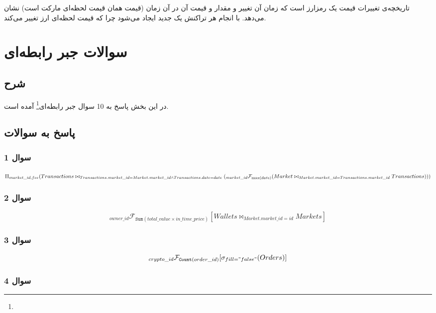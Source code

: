 \documentclass{book}
\begin{document}
\subsection{}
تاریخچه‌ی تغییرات قیمت یک رمزارز است که زمان آن تغییر و مقدار و قیمت آن در آن زمان (قیمت همان قیمت لحظه‌ای مارکت است) نشان می‌دهد. با انجام هر تراکنش یک  جدید ایجاد می‌شود چرا که قیمت لحظه‌ای ارز تغییر می‌کند.




\chapter{سوالات جبر رابطه‌ای}
\section{شرح}
در این بخش پاسخ به 10 سوال جبر رابطه‌ای\footnote{} آمده است.
\section{پاسخ به سوالات}
\subsection{سوال 1}

$\Pi_{market\_id, fee}(Transactions \\ \bowtie_{Transactions.market\_id = Market.market\_id \land Transactions.date = date}(\\
    _{market\_id}\mathcal{F}_{\max (date)} (\\
    Market \bowtie_{Market.market\_id = Transactions.market\_id} Transactions)))$

\subsection{سوال 2}
$$_{owner\_id}\mathcal{F}_{\mathtt{Sum}(total\_value \times in\_time\_price)} [ Wallets \bowtie_{Market.market\_id = id} Markets]$$

\subsection{سوال 3}
$$_{crypto\_id} \mathcal{F}_{\mathtt{Count}(order\_id)} [\sigma_{fill = "false"} (Orders)]$$

\subsection{سوال 4}
\end{document}
